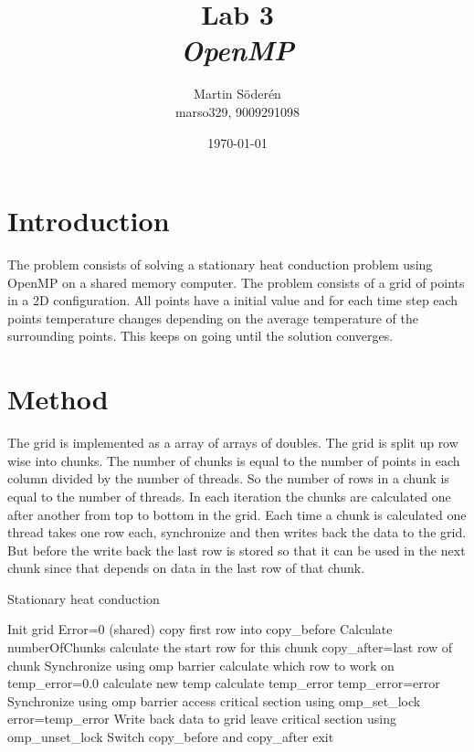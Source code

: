 \documentclass[10pt,twocolumn]{article}
\title{Lab 3\\ \emph{OpenMP}}
\author{Martin Söderén \\ marso329, 9009291098 }
\date{\today}
\begin{document}
\maketitle

\clearpage

\section{Introduction}

The problem consists of solving a stationary heat conduction problem using OpenMP on a shared memory computer. The problem consists of a grid of points in a 2D configuration. All points have a initial value and for each time step each points temperature changes depending on the average temperature of the surrounding points. This keeps on going until the solution converges. 
\section{Method}
The grid is implemented as a array of arrays of doubles. The grid is split up row wise into chunks. The number of chunks is equal to the number of points in each column divided by the number of threads. So the number of rows in a chunk is equal to the number of threads. In each iteration the chunks are calculated one after another from top to bottom in the grid. Each time a chunk is calculated one thread takes one row each, synchronize and then writes back the data to the grid. But before the write back the last row is stored so that it can be used in the next chunk since that depends on data in the last row of that chunk. 

\begin{algorithm}[H]
\caption{Stationary heat conduction}
\label{alg:Master}
\begin{algorithmic}
\State Init grid
\EndIf
{}
\State Error=0 (shared)
\State copy first row into copy\_before
\State Calculate numberOfChunks
\State calculate the start row for this chunk
\State copy\_after=last row of chunk 
\EndIf
\State Synchronize using omp barrier
\State calculate which row to work on
\State temp\_error=0.0
\State calculate new temp
\State calculate temp\_error
\State temp\_error=error
\EndIf
\EndFor
\State Synchronize using omp barrier
\State access critical section using omp\_set\_lock
\State error=temp\_error
\EndIf
\State Write back data to grid
\State leave critical section using omp\_unset\_lock
\State Switch copy\_before and copy\_after
\EndIf
\EndFor
{}
\State exit
\EndIf

\EndFor
\EndProcedure
\end{algorithmic}
\end{algorithm}
\end{document}

